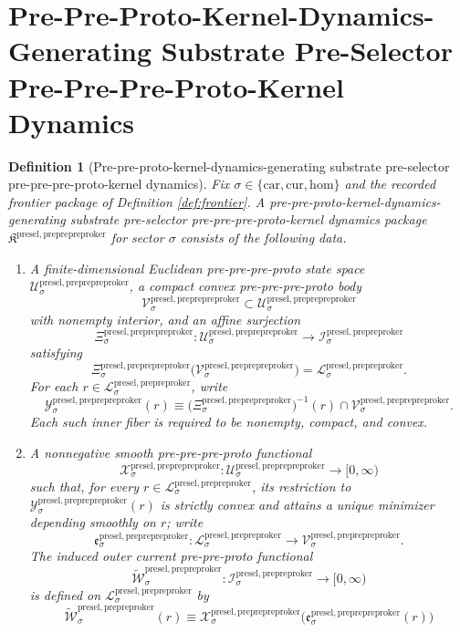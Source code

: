 \documentclass[11pt]{article}
\newcommand{\Car}{\mathrm{car}}
\newcommand{\Cur}{\mathrm{cur}}
\newcommand{\Hom}{\mathrm{hom}}
\newcommand{\PrePreProtoKernelSpace}[1]{\mathcal I_{#1}^{\mathrm{presel,prepreproker}}}
\newcommand{\PrePreProtoKernelBody}[1]{\mathcal L_{#1}^{\mathrm{presel,prepreproker}}}
\newcommand{\PrePrePreProtoKernelPackage}{\mathfrak K^{\mathrm{presel,preprepreproker}}}
\newcommand{\PrePrePreProtoKernelSpace}[1]{\mathcal U_{#1}^{\mathrm{presel,preprepreproker}}}
\newcommand{\PrePrePreProtoKernelBody}[1]{\mathcal V_{#1}^{\mathrm{presel,preprepreproker}}}
\newcommand{\PrePrePreProtoKernelProj}[1]{\Xi_{#1}^{\mathrm{presel,preprepreproker}}}
\newcommand{\PrePrePreProtoKernelFiber}[2]{\mathcal Y_{#1}^{\mathrm{presel,preprepreproker}}(#2)}
\newcommand{\PrePrePreProtoKernelFunctional}[1]{\mathscr X_{#1}^{\mathrm{presel,preprepreproker}}}
\newcommand{\PrePrePreProtoKernelMinLift}[1]{\mathfrak e_{#1}^{\mathrm{presel,preprepreproker}}}
\newcommand{\InducedPrePreProtoKernelFunctional}[1]{\widetilde{\mathscr W}_{#1}^{\mathrm{presel,prepreproker}}}
\newtheorem{definition}{Definition}
\begin{document}
\section{Pre-Pre-Proto-Kernel-Dynamics-Generating Substrate Pre-Selector Pre-Pre-Pre-Proto-Kernel Dynamics}

\begin{definition}[Pre-pre-proto-kernel-dynamics-generating substrate pre-selector pre-pre-pre-proto-kernel dynamics]
\label{def:preprepreproto}
Fix \(\sigma\in\{\Car,\Cur,\Hom\}\) and the recorded frontier package of Definition \ref{def:frontier}. A \emph{pre-pre-proto-kernel-dynamics-generating substrate pre-selector pre-pre-pre-proto-kernel dynamics package} \(\PrePrePreProtoKernelPackage\) for sector \(\sigma\) consists of the following data.
\begin{enumerate}
    \item A finite-dimensional Euclidean pre-pre-pre-proto state space \(\PrePrePreProtoKernelSpace{\sigma}\), a compact convex pre-pre-pre-proto body
    \[
    \PrePrePreProtoKernelBody{\sigma}\subset\PrePrePreProtoKernelSpace{\sigma}
    \]
    with nonempty interior, and an affine surjection
    \[
    \PrePrePreProtoKernelProj{\sigma}:\PrePrePreProtoKernelSpace{\sigma}\to\PrePreProtoKernelSpace{\sigma}
    \]
    satisfying
    \[
    \PrePrePreProtoKernelProj{\sigma}\bigl(\PrePrePreProtoKernelBody{\sigma}\bigr)=\PrePreProtoKernelBody{\sigma}.
    \]
    For each \(r\in\PrePreProtoKernelBody{\sigma}\), write
    \[
    \PrePrePreProtoKernelFiber{\sigma}{r}
    \equiv
    \bigl(\PrePrePreProtoKernelProj{\sigma}\bigr)^{-1}(r)\cap\PrePrePreProtoKernelBody{\sigma}.
    \]
    Each such inner fiber is required to be nonempty, compact, and convex.
    \item A nonnegative smooth pre-pre-pre-proto functional
    \[
    \PrePrePreProtoKernelFunctional{\sigma}:\PrePrePreProtoKernelSpace{\sigma}\to[0,\infty)
    \]
    such that, for every \(r\in\PrePreProtoKernelBody{\sigma}\), its restriction to \(\PrePrePreProtoKernelFiber{\sigma}{r}\) is strictly convex and attains a unique minimizer depending smoothly on \(r\); write
    \[
    \PrePrePreProtoKernelMinLift{\sigma}:\PrePreProtoKernelBody{\sigma}\to\PrePrePreProtoKernelBody{\sigma}.
    \]
    The induced outer current pre-pre-proto functional
    \[
    \InducedPrePreProtoKernelFunctional{\sigma}:\PrePreProtoKernelSpace{\sigma}\to[0,\infty)
    \]
    is defined on \(\PrePreProtoKernelBody{\sigma}\) by
    \[
    \InducedPrePreProtoKernelFunctional{\sigma}(r)
    \equiv
    \PrePrePreProtoKernelFunctional{\sigma}\bigl(\PrePrePreProtoKernelMinLift{\sigma}(r)\bigr)
\]
\end{enumerate}
\end{definition}
\end{document}
